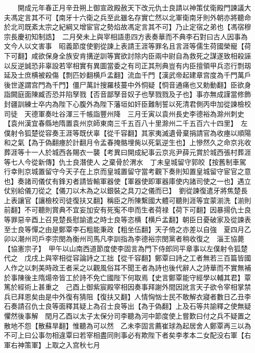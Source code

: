 　　開成元年春正月辛丑朔上御宣政殿赦天下改元仇士良請以神策仗衛殿門諫議大夫馮定言其不可【南牙十六衛之兵至此雖名存實亡然以北軍衛南牙則外朝亦將聽命於北司既紊太宗之紀綱又增宦官之勢焰故馮定言其不可】乃止定宿之弟也【馮宿穆宗長慶初知制誥】　二月癸未上與宰相語患四方表奏華而不典李石對曰古人因事為文今人以文害事　昭義節度使劉從諫上表請王涯等罪名且言涯等儒生荷國榮寵【荷下可翻】咸欲保身全族安肯搆逆訓等實欲討除内臣兩中尉自為救死之謀遂致相殺誣以反逆誠恐非辜設若宰相實有異圖當委之有司正其刑典豈有内臣擅領甲兵恣行剽刼延及士庶横被殺傷【剽匹妙翻横戶孟翻】流血千門【漢武帝起建章宫度為千門萬戶後世遂謂宫門為千門】僵尸萬計搜羅枝蔓中外恫疑【恫音通痛也又勅動翻】臣欲身詣闕庭面陳臧否恐并陷孥戮【否音鄙孥音奴子也孥戮戮及子也】事亦無成謹當修飾封疆訓練士卒内為陛下心腹外為陛下藩垣如奸臣難制誓以死清君側丙申加從諫檢校司徒　天德軍奏吐谷渾三千帳詣豐州降　三月壬寅以袁州長史李德裕為滁州刺史【袁州漢宜春縣地隋置袁州京師東南三千五百八十里滁州二千五百六十四里】　左僕射令狐楚從容奏王涯等既伏辜【從千容翻】其家夷滅遺骨棄捐請官為收瘞以順陽和之氣【為于偽翻瘞於計翻月令孟春掩骼埋胔以死氣逆生也】上慘然久之命京兆收葬涯等十一人於城西各賜衣一襲【考異曰開成紀事云京兆尹薛元賞於城西張村葬涯等七人今從新傳】仇士良潛使人之棄骨於渭水　丁未皇城留守郭皎【按舊制車駕行幸則京城置留守今天子在上京而皇城置留守當考觀下奏則知置皇城留守宦官之意也】奏諸司儀仗有鋒刃者請皆輸軍器使【軍器使即軍器庫使内諸司使之一也】遇立仗别給儀刀從之【儀刀以木為之以銀裝之具刀之儀而已】　劉從諫復遣牙將焦楚長上表讓官【讓檢校司徒復扶又翻】稱臣之所陳繫國大體可聽則涯等宜蒙湔洗【湔則前翻】不可聽則賞典不宜妄加安有死寃不申而生者荷禄【荷下可翻】因暴揚仇士良等罪惡辛酉上召見楚長慰諭遣之時士良等恣横【横戶孟翻】朝臣日憂破家及從諫表至士良等憚之由是鄭覃李石粗能秉政【粗坐伍翻】天子倚之亦差以自強　夏四月乙卯以潮州司戶李宗閔為衡州司馬凡李訓指為李德裕宗閔黨者稍收復之　淄王協薨【協憲宗子】　甲午以山南西道節度使李固言為門下侍郎同平章事以左僕射令狐楚代之　戊戌上與宰相從容論詩之工拙【從千容翻】鄭覃曰詩之工者無若三百篇皆國人作之以刺美時政王者采之以觀風俗耳不聞王者為詩也後代辭人之詩華而不實無補於事陳後主隋煬帝皆工於詩不免亡國陛下何取焉【史言鄭覃能守經學以輔其君】覃篤於經術上甚重之　己酉上御紫宸殿宰相因奏事拜謝外間因訛言天子欲令宰相掌禁兵已拜恩矣由是中外復有猜阻【復扶又翻】人情恟忷士民不敢解衣寢者數日乙丑李石奏請召仇士良等面釋其疑上為召士良等出【為于偽翻】上及石等共諭釋之使無疑懼然後事解　閏月乙酉以太子太保分司李聽為河中節度使上嘗歎曰付之兵不疑置之散地不怨【散蘇旱翻】惟聽為可以然　乙未李固言薦崔球為起居舍人鄭覃再三以為不可上曰公事勿相違覃曰若宰相盡同則事必有欺陛下者矣李孝本二女配没右軍【右軍右神策軍】上取之入宫秋七月

